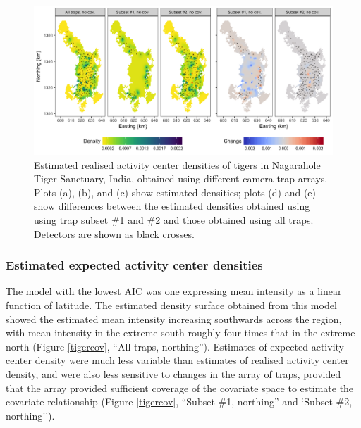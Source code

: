 \documentclass[10pt,a4paper]{article}
\begin{document}
\begin{figure}[htbp]
\centering
\includegraphics[width=1\textwidth]{tiger_surfaces_nocovs.png}
\caption{Estimated realised activity center densities of tigers in Nagarahole Tiger Sanctuary, India, obtained using different camera trap arrays. Plots (a), (b), and (c) show estimated densities; plots (d) and (e) show differences between the estimated densities obtained using using trap subset \#1 and \#2 and those obtained using all traps. Detectors are shown as black crosses.}
\label{tigernocov}
\end{figure}

\subsubsection{Estimated expected activity center densities}

The model with the lowest AIC was one expressing mean intensity as a linear function of latitude. The estimated density surface obtained from this model showed the estimated mean intensity increasing southwards across the region, with mean intensity in the extreme south roughly four times that in the extreme north (Figure \ref{tigercov}, ``All traps, northing''). Estimates of expected activity center density were much less variable than estimates of realised activity center density, and were also less sensitive to changes in the array of traps, provided that the array provided sufficient coverage of the covariate space to estimate the covariate relationship (Figure \ref{tigercov}, ``Subset \#1, northing'' and `Subset \#2, northing''). 
\end{document}

